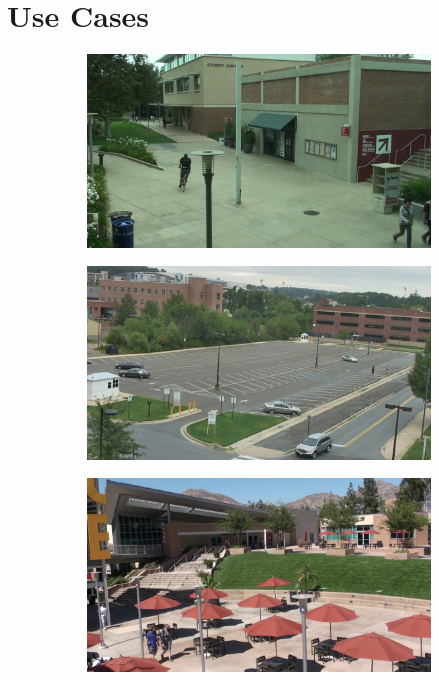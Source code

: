 \section{Use Cases}
\begin{figure}[H]
    \centering
    \begin{subfigure}{0.49\linewidth}
        \includegraphics[width=\linewidth]{resources/methodology/surveillance_example1.png}
    \end{subfigure}
    \begin{subfigure}{0.49\linewidth}
        \includegraphics[width=\linewidth]{resources/methodology/surveillance_example2.png}
    \end{subfigure}
    \begin{subfigure}{0.49\linewidth}
        \includegraphics[width=\linewidth]{resources/methodology/surveillance_example3.png}

\end{subfigure}
\end{figure}
